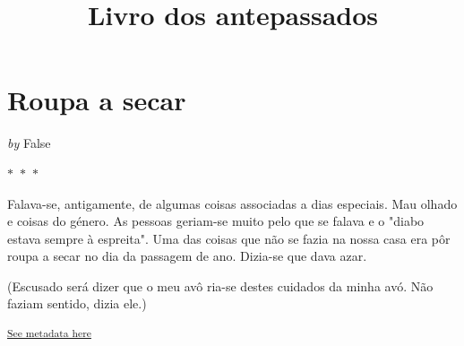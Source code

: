 \documentclass{article}
\title{ Livro dos antepassados }
\author{  }
\date{}
\begin{document}
\maketitle
\tableofcontents

\newpage
{}


\newpage
\section{Roupa a secar}


    
        \textit{by} False
    


 
    

    $\ast$~$\ast$~$\ast$  


    \begin{center}
        \begin{minipage}{0.9\textwidth}
            \setlength{\parskip}{0.2cm}
            \setlength{\parindent}{0cm}
            \fontsize{12pt}{14pt}\selectfont
            


Falava-se, antigamente, de algumas coisas associadas a dias especiais.
Mau olhado e coisas do género. As pessoas geriam-se muito pelo que se
falava e o "diabo estava sempre à espreita". Uma das coisas que não se
fazia na nossa casa era pôr roupa a secar no dia da passagem de ano.
Dizia-se que dava azar.

(Escusado será dizer que o meu avô ria-se destes cuidados da minha avó. Não
faziam sentido, dizia ele.)

        \end{minipage}
    \end{center}

    
        \textsuperscript{\hyperref[table:\arabic{tablecounter}]{See metadata here}}
    
\end{document}
